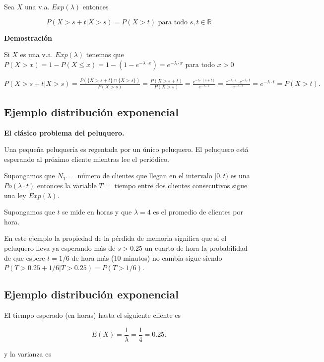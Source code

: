 \documentclass[]{book}
\begin{document}
Sea \(X\) una v.a. \(Exp(\lambda)\) entonces

\[P(X>s+t\big|X>s)=P(X>t)\mbox{  para todo } s,t\in \mathbb{R}\]

\textbf{Demostración}

Si \(X\) es una v.a. \(Exp(\lambda)\) tenemos que \(P(X>x)=1-P(X\leq x)=1-(1-e^{-\lambda\cdot x})=e^{-\lambda\cdot x}\) para todo \(x>0\)

\(P(X>s+t\big|X>s)=\frac{P(\{X>s+t\}\cap \{X>s\})}{P(X>s)}=\frac{P(X>s+t)}{P(X>s)}=\frac{e^{-\lambda\cdot (s+t)}}{e^{-\lambda\cdot s}}= \frac{e^{-\lambda\cdot s}\cdot e^{-\lambda\cdot t} }{e^{-\lambda\cdot s}}=e^{-\lambda\cdot t}=P(X>t).\)

\hypertarget{ejemplo-distribuciuxf3n-exponencial}{%
\subsection{Ejemplo distribución exponencial}\label{ejemplo-distribuciuxf3n-exponencial}}

\textbf{El clásico problema del peluquero.}

Una pequeña peluquería es regentada por un único peluquero. El peluquero está esperando al próximo cliente mientras lee el periódico.

Supongamos que \(N_T=\) número de clientes que llegan en el intervalo \([0,t)\) es una \(Po(\lambda\cdot t)\) entonces la variable \(T=\) tiempo entre dos clientes consecutivos sigue una ley \(Exp(\lambda)\).

Supongamos que \(t\) se mide en horas y que \(\lambda=4\) es el promedio de clientes por hora.

En este ejemplo la propiedad de la pérdida de memoria significa que
si el peluquero lleva ya esperando más de \(s>0.25\) un cuarto de hora la probabilidad de que espere \(t=1/6\) de hora más (10 minutos) no cambia sigue siendo \(P(T>0.25+1/6|T>0.25)=P(T>1/6).\)

\hypertarget{ejemplo-distribuciuxf3n-exponencial-1}{%
\subsection{Ejemplo distribución exponencial}\label{ejemplo-distribuciuxf3n-exponencial-1}}

El tiempo esperado (en horas) hasta el siguiente cliente es

\[
E(X)=\frac{1}{\lambda}=\frac{1}{4}=0.25.
\]

y la varianza es
\end{document}
